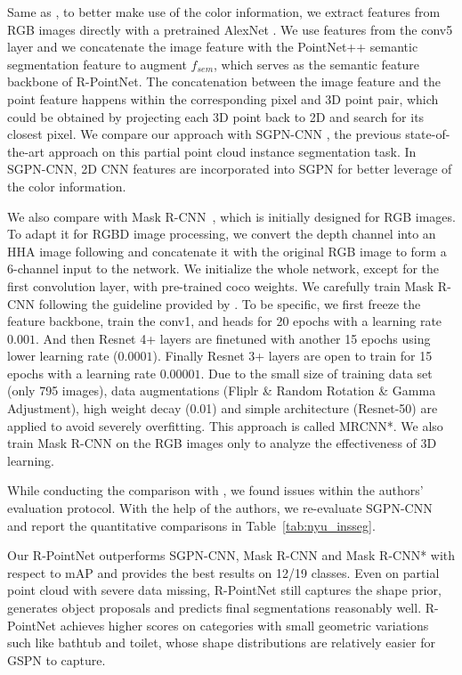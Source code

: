 \documentclass[10pt,twocolumn,letterpaper]{article}
\begin{document}
Same as \cite{wang2018sgpn}, to better make use of the color information, we extract features from RGB images directly with a pretrained AlexNet \cite{krizhevsky2012imagenet}. We use features from the conv5 layer and we concatenate the image feature with the PointNet++ semantic segmentation feature to augment $f_{sem}$, which serves as the semantic feature backbone of R-PointNet. The concatenation between the image feature and the point feature happens within the corresponding pixel and 3D point pair, which could be obtained by projecting each 3D point back to 2D and search for its closest pixel. We compare our approach with SGPN-CNN \cite{wang2018sgpn}, the previous state-of-the-art approach on this partial point cloud instance segmentation task. In SGPN-CNN, 2D CNN features are incorporated into SGPN for better leverage of the color information.

We also compare with Mask R-CNN~\cite{he2017mask}, which is initially designed for RGB images. To adapt it for RGBD image processing, we convert the depth channel into an HHA image following \cite{gupta2014learning} and concatenate it with the original RGB image to form a 6-channel input to the network. We initialize the whole network, except for the first convolution layer, with pre-trained coco weights. We carefully train Mask R-CNN following the guideline provided by \cite{maskrcnnwiki}. To be specific, we first freeze the feature backbone, train the conv1, and heads for 20 epochs with a learning rate $0.001$. And then Resnet 4+ layers are finetuned with another 15 epochs using lower learning rate ($0.0001$). Finally Resnet 3+ layers are open to train for 15 epochs with a learning rate $0.00001$. Due to the small size of training data set (only 795 images), data augmentations (Fliplr \&  Random Rotation \& Gamma Adjustment), high weight decay (0.01) and simple architecture (Resnet-50) are applied to avoid severely overfitting.
This approach is called MRCNN*. We also train Mask R-CNN on the RGB images only to analyze the effectiveness of 3D learning.


While conducting the comparison with \cite{wang2018sgpn}, we found issues within the authors' evaluation protocol. With the help of the authors, we re-evaluate SGPN-CNN and report the quantitative comparisons in Table~\ref{tab:nyu_insseg}.

Our R-PointNet outperforms SGPN-CNN, Mask R-CNN and Mask R-CNN* with respect to mAP and provides the best results on 12/19 classes. Even on partial point cloud with severe data missing, R-PointNet still captures the shape prior, generates object proposals and predicts final segmentations reasonably well. R-PointNet achieves higher scores on categories with small geometric variations such like bathtub and toilet, whose shape distributions are relatively easier for GSPN to capture. 
\end{document}
